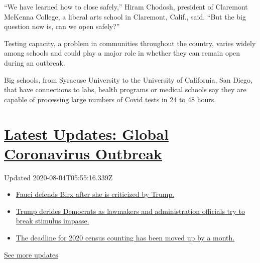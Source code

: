 ``We have learned how to close safely,'' Hiram Chodosh, president of
Claremont McKenna College, a liberal arts school in Claremont, Calif.,
said. ``But the big question now is, can we open safely?''

Testing capacity, a problem in communities throughout the country,
varies widely among schools and could play a major role in whether they
can remain open during an outbreak.

Big schools, from Syracuse University to the University of California,
San Diego, that have connections to labs, health programs or medical
schools say they are capable of processing large numbers of Covid tests
in 24 to 48 hours.

\hypertarget{latest-updates-global-coronavirus-outbreak}{%
\section{\texorpdfstring{\href{https://www.nytimes.com/2020/08/03/world/coronavirus-covid-19.html?action=click\&pgtype=Article\&state=default\&region=MAIN_CONTENT_1\&context=storylines_live_updates}{Latest
Updates: Global Coronavirus
Outbreak}}{Latest Updates: Global Coronavirus Outbreak}}\label{latest-updates-global-coronavirus-outbreak}}

Updated 2020-08-04T05:55:16.339Z

\begin{itemize}
\tightlist
\item
  \href{https://www.nytimes.com/2020/08/03/world/coronavirus-covid-19.html?action=click\&pgtype=Article\&state=default\&region=MAIN_CONTENT_1\&context=storylines_live_updates\#link-4547638f}{Fauci
  defends Birx after she is criticized by Trump.}
\item
  \href{https://www.nytimes.com/2020/08/03/world/coronavirus-covid-19.html?action=click\&pgtype=Article\&state=default\&region=MAIN_CONTENT_1\&context=storylines_live_updates\#link-15e7f995}{Trump
  derides Democrats as lawmakers and administration officials try to
  break stimulus impasse.}
\item
  \href{https://www.nytimes.com/2020/08/03/world/coronavirus-covid-19.html?action=click\&pgtype=Article\&state=default\&region=MAIN_CONTENT_1\&context=storylines_live_updates\#link-e5a2cda}{The
  deadline for 2020 census counting has been moved up by a month.}
\end{itemize}

\href{https://www.nytimes.com/2020/08/03/world/coronavirus-covid-19.html?action=click\&pgtype=Article\&state=default\&region=MAIN_CONTENT_1\&context=storylines_live_updates}{See
more updates}

